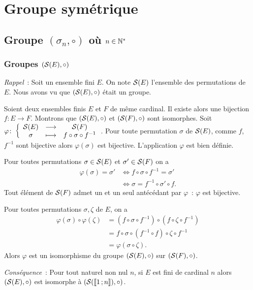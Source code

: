 \chapter{Groupe symétrique}
\label{chap:groupesymetrique}
\minitoc
\minilof
\minilot

\section{Groupe $(\sigma_n, \circ)$ où $n \in \N^*$}

\subsection{Groupes $(\S(E),\circ)$}

\emph{Rappel}~: Soit un ensemble fini $E$. On note $\S(E)$ l'ensemble des permutations de $E$. Nous avons vu que $(\S(E),\circ)$ était un groupe.

Soient deux ensembles finis $E$ et $F$ de même cardinal. Il existe alors une bijection $f: E \rightarrow F$. Montrons que $(\S(E),\circ)$ et $(\S(F),\circ)$ sont isomorphes. Soit $\fonction{\varphi}{\S(E)}{\S(F)}{\sigma}{f \circ \sigma \circ f^{-1}}$. Pour toute permutation $\sigma$ de $\S(E)$, comme $f$, $f^{-1}$ sont bijective alors $\varphi(\sigma)$ est bijective. L'application $\varphi$ est bien définie.

Pour toutes permutations $\sigma \in \S(E)$ et $\sigma' \in \S(F)$ on a
\begin{align}
  \varphi(\sigma)=\sigma' &\iff f \circ \sigma \circ f^{-1} = \sigma' \\
  & \iff \sigma =f^{-1} \circ \sigma' \circ f.
\end{align}
Tout élément de $\S(F)$ admet un et un seul antécédant par $\varphi$~: $\varphi$ est bijective.

Pour toutes permutations $\sigma, \zeta$ de $E$, on a
\begin{align}
  \varphi(\sigma) \circ \varphi(\zeta) &= (f \circ \sigma \circ f^{-1}) \circ (f \circ \zeta \circ f^{-1}) \\
  &=f \circ \sigma \circ (f^{-1} \circ f) \circ \zeta \circ f^{-1} \\
  &=\varphi(\sigma \circ \zeta).
\end{align}
Alors $\varphi$ est un isomorphisme du groupe $(\S(E),\circ)$ sur $(\S(F),\circ)$.

\emph{Conséquence}~: Pour tout naturel non nul $n$, si $E$ est fini de cardinal $n$ alors $(\S(E),\circ)$ est isomorphe à  $(\S(\intervalleentier{1}{n}),\circ)$.

